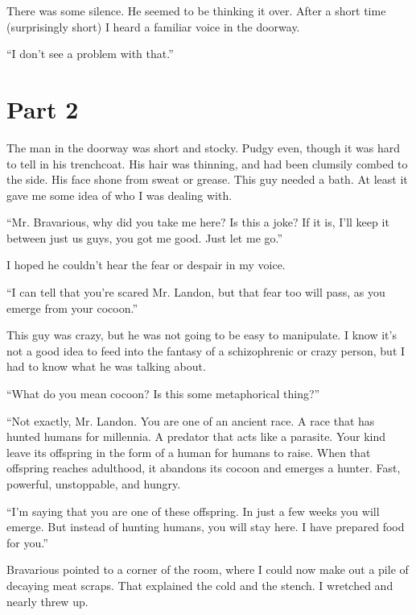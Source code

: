 There was some silence. He seemed to be thinking it over. After a
short time (surprisingly short) I heard a familiar voice in the
doorway.



``I don't see a problem with that.'' 

\section*{Part 2} 

The man in the doorway was short and stocky. Pudgy even, though it
was hard to tell in his trenchcoat. His hair was thinning, and had
been clumsily combed to the side. His face shone from sweat or
grease. This guy needed a bath. At least it gave me some idea of
who I was dealing with.



``Mr. Bravarious, why did you take me here? Is this a joke? If
it is, I'll keep it between just us guys, you got me good.
Just let me go.''



I hoped he couldn't hear the fear or despair in my
voice.



``I can tell that you're scared Mr. Landon, but that
fear too will pass, as you emerge from your cocoon.''



This guy was crazy, but he was not going to be easy to manipulate.
I know it's not a good idea to feed into the fantasy of a
schizophrenic or crazy person, but I had to know what he was
talking about.



``What do you mean cocoon? Is this some metaphorical
thing?''



``Not exactly, Mr. Landon. You are one of an ancient race. A
race that has hunted humans for millennia. A predator that acts
like a parasite. Your kind leave its offspring in the form of a
human for humans to raise. When that offspring reaches adulthood,
it abandons its cocoon and emerges a hunter. Fast, powerful,
unstoppable, and hungry.



``I'm saying that you are one of these offspring. In just a
few weeks you will emerge. But instead of hunting humans, you will
stay here. I have prepared food for you.''



Bravarious pointed to a corner of the room, where I could now make
out a pile of decaying meat scraps. That explained the cold and the
stench. I wretched and nearly threw up.



